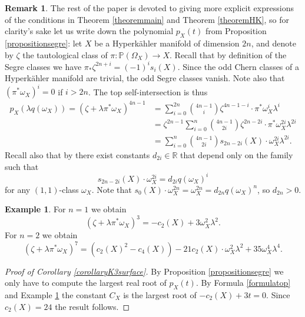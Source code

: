 \documentclass[JEP,XML,SOM,Unicode,NoEqCountersInSection,published]{cedram}
\theoremstyle{plain}
\theoremstyle{definition}
\newtheorem{remark}[theorem]{Remark}
\newtheorem{example}[theorem]{Example}
\newcommand{\R}{\ensuremath{\mathbb{R}}}
\newcommand{\PP}{\ensuremath{\mathbb{P}}}
\begin{document}
\begin{remark}
The rest of the paper is devoted to giving more explicit expressions of the conditions
in Theorem \ref{theoremmain} and Theorem \ref{theoremHK}, so for clarity's sake let us write down the polynomial
$p_X(t)$ from Proposition \ref{propositionsegre}:
let $X$ be a Hyperkähler manifold of dimension $2n$, and denote by $\zeta$ the tautological class of $\pi: \PP(\Omega_X)\to X$.
Recall that by definition of the Segre classes we have $\pi_* \zeta^{2n+i}=(-1)^i s_i(X)$.
Since the odd Chern classes of a Hyperkähler manifold are trivial,
the odd Segre classes vanish. Note also that $(\pi^*\omega_X)^i=0$ if $i > 2n$.
The top self-intersection is thus
\begin{equation}\label{formulatop}
\begin{split}
p_X(\lambda q(\omega_X))= (\zeta+\lambda \pi^*\omega_X)^{4n-1}&=\sum_{i=0}^{2n} \binom{4n-1}{i}\zeta^{4n-1-i} \cdot \pi^*\omega_X^{i} \lambda^i
\\ &= \zeta^{2n-1}\sum_{i=0}^{n} \binom{4n-1}{2i} \zeta^{2n-2i} \cdot \pi^* \omega_X^{2i} \lambda^{2i}
\\ &=\sum_{i=0}^{n} \binom{4n-1}{2i} s_{2n-2i}(X) \cdot \omega_X^{2i} \lambda^{2i}.
\end{split}
\end{equation}
Recall also
that by \cite[Rem.\,4.12]{F87}
there exist constants $d_{2i} \in \R$
that depend only on the family such that
\begin{equation}\label{intersectionsegre}
s_{2n-2i}(X) \cdot \omega_X^{2i}= d_{2i} q(\omega_X)^{i}
\end{equation}
for any $(1,1)$-class $\omega_X$. Note that $s_{0}(X) \cdot \omega_X^{2n}= \omega_X^{2n} = d_{2n} q(\omega_X)^{n}$, so $d_{2n}>0$.
\end{remark}

\begin{example} \label{exampletop}
For $n=1$ we obtain
\[
(\zeta+\lambda \pi^*\omega_X)^{3} = - c_2(X)+3 \omega_X^2 \lambda^2.
\]
For $n=2$ we obtain
\[
(\zeta+ \lambda\pi^* \omega_X)^7
=(c_2(X)^2-c_4(X))-21 c_2(X) \cdot \omega_X^2 \lambda^2+ 35 \omega_X^4 \lambda^4.
\]
\end{example}

\begin{proof}[Proof of Corollary \ref{corollaryK3surface}]
By Proposition \ref{propositionsegre} we only have to compute the
largest real root of $p_X(t)$.
By Formula \eqref{formulatop} and
Example \ref{exampletop} the constant $C_X$ is the largest root of $-c_2(X)+3 t=0$. Since $c_2(X)=24$ the result follows.
\end{proof}
\end{document}
